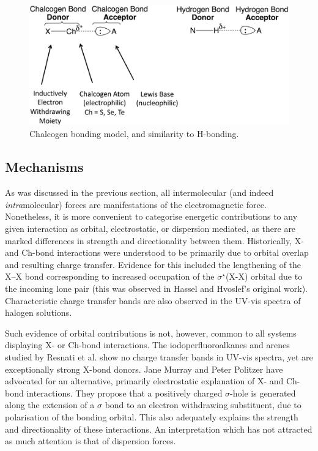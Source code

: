 \begin{refsection}
\begin{figure}
    \centering
    \includegraphics[width=0.8\linewidth]{Figures/ch-bonding.pdf}
    \caption{Chalcogen bonding model, and similarity to H-bonding.}
    \label{fig:ch-bonding-intro}
\end{figure}

\subsection{Mechanisms}
As was discussed in the previous section, all intermolecular (and indeed \emph{intra}molecular) forces are manifestations of the electromagnetic force.
Nonetheless, it is more convenient to categorise energetic contributions to any given interaction as orbital, electrostatic, or dispersion mediated, as there are marked differences in strength and directionality between them.
Historically, X- and Ch-bond interactions were understood to be primarily due to orbital overlap and resulting charge transfer.
Evidence for this included the lengthening of the X--X bond corresponding to increased occupation of the $\sigma^{\star}$(X-X) orbital due to the incoming lone pair (this was observed in Hassel and Hvoslef's original work\autocite{Hassel1954}).
Characteristic charge transfer bands are also observed in the UV-vis spectra of halogen solutions.\autocite{Blackstock1987}

Such evidence of orbital contributions is not, however, common to all systems displaying X- or Ch-bond interactions.
The iodoperfluoroalkanes and arenes studied by Resnati et al. show no charge transfer bands in UV-vis spectra, yet are exceptionally strong X-bond donors.\autocite{Yan2014}
Jane Murray and Peter Politzer have advocated for an alternative, primarily electrostatic explanation of X- and Ch-bond interactions.\autocite{Murray2008,Murray2009}
They propose that a positively charged $\sigma$-hole is generated along the extension of a $\sigma$ bond to an electron withdrawing substituent, due to polarisation of the bonding orbital.
This also adequately explains the strength and directionality of these interactions.
An interpretation which has not attracted as much attention is that of dispersion forces.


\end{refsection}

